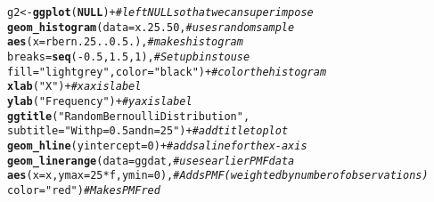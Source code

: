 \documentclass{article}\usepackage[]{graphicx}\usepackage[]{color}
\makeatletter
\newcommand{\hlnum}[1]{\textcolor[rgb]{0.686,0.059,0.569}{#1}}%
\newcommand{\hlstr}[1]{\textcolor[rgb]{0.192,0.494,0.8}{#1}}%
\newcommand{\hlcom}[1]{\textcolor[rgb]{0.678,0.584,0.686}{\textit{#1}}}%
\newcommand{\hlopt}[1]{\textcolor[rgb]{0,0,0}{#1}}%
\newcommand{\hlstd}[1]{\textcolor[rgb]{0.345,0.345,0.345}{#1}}%
\newcommand{\hlkwa}[1]{\textcolor[rgb]{0.161,0.373,0.58}{\textbf{#1}}}%
\newcommand{\hlkwb}[1]{\textcolor[rgb]{0.69,0.353,0.396}{#1}}%
\newcommand{\hlkwc}[1]{\textcolor[rgb]{0.333,0.667,0.333}{#1}}%
\newcommand{\hlkwd}[1]{\textcolor[rgb]{0.737,0.353,0.396}{\textbf{#1}}}%
\newenvironment{kframe}{%
 \def\at@end@of@kframe{}%
 \ifinner\ifhmode%
  \def\at@end@of@kframe{\end{minipage}}%
  \begin{minipage}{\columnwidth}%
 \fi\fi%
 \def\FrameCommand##1{\hskip\@totalleftmargin \hskip-\fboxsep
 \colorbox{shadecolor}{##1}\hskip-\fboxsep
     \hskip-\linewidth \hskip-\@totalleftmargin \hskip\columnwidth}%
 \MakeFramed {\advance\hsize-\width
   \@totalleftmargin\z@ \linewidth\hsize
   \@setminipage}}%
 {\par\unskip\endMakeFramed%
 \at@end@of@kframe}
\newenvironment{knitrout}{}{} %
\makeatother
\begin{document}
\begin{enumerate}
\begin{knitrout}
\begin{kframe}
\begin{alltt}
\hlstd{g2}\hlkwb{<-}\hlkwd{ggplot}\hlstd{(}\hlkwa{NULL}\hlstd{)} \hlopt{+}                                      \hlcom{#left NULL so that we can superimpose}
  \hlkwd{geom_histogram}\hlstd{(}\hlkwc{data}\hlstd{=x.25.50,}                          \hlcom{#uses random sample}
                 \hlkwd{aes}\hlstd{(}\hlkwc{x}\hlstd{=rbern.25..0.5.),}                 \hlcom{#makes histogram}
                 \hlkwc{breaks}\hlstd{=}\hlkwd{seq}\hlstd{(}\hlopt{-}\hlnum{0.5}\hlstd{,}\hlnum{1.5}\hlstd{,}\hlnum{1}\hlstd{),}                \hlcom{#Set up bins to use}
                 \hlkwc{fill} \hlstd{=} \hlstr{"lightgrey"}\hlstd{,} \hlkwc{color}\hlstd{=}\hlstr{"black"}\hlstd{)} \hlopt{+}   \hlcom{#color the histogram}
  \hlkwd{xlab}\hlstd{(}\hlstr{"X"}\hlstd{)} \hlopt{+}                                           \hlcom{#x axis label}
  \hlkwd{ylab}\hlstd{(}\hlstr{"Frequency"}\hlstd{)}\hlopt{+}                                    \hlcom{#y axis label}
  \hlkwd{ggtitle}\hlstd{(}\hlstr{"Random Bernoulli Distribution"}\hlstd{,}
          \hlkwc{subtitle} \hlstd{=} \hlstr{"With p=0.5 and n=25"}\hlstd{)} \hlopt{+}           \hlcom{#add title to plot}
  \hlkwd{geom_hline}\hlstd{(}\hlkwc{yintercept}\hlstd{=}\hlnum{0}\hlstd{)} \hlopt{+}                            \hlcom{#adds a line for the x-axis}
  \hlkwd{geom_linerange}\hlstd{(}\hlkwc{data}\hlstd{=ggdat,}                            \hlcom{#uses earlier PMF data}
                 \hlkwd{aes}\hlstd{(}\hlkwc{x}\hlstd{=x,} \hlkwc{ymax}\hlstd{=}\hlnum{25}\hlopt{*}\hlstd{f,} \hlkwc{ymin}\hlstd{=}\hlnum{0}\hlstd{),}           \hlcom{#Adds PMF (weighted by number of observations)}
                 \hlkwc{color}\hlstd{=}\hlstr{"red"}\hlstd{)}                           \hlcom{#Makes PMF red}


\end{alltt}
\end{kframe}
\end{knitrout}
\end{enumerate}
\end{document}
